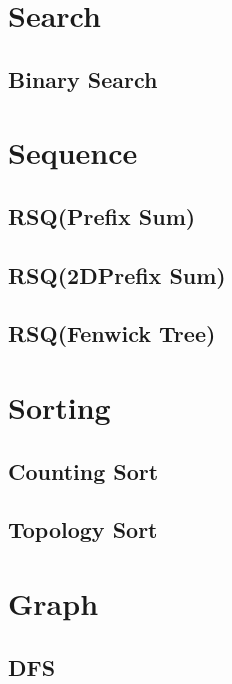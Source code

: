 \section{Search}

\subsection{Binary Search}

\section{Sequence}

\subsection{RSQ(Prefix Sum)}


\subsection{RSQ(2DPrefix Sum)}


\subsection{RSQ(Fenwick Tree)}

\section{Sorting}

\subsection{Counting Sort}


\subsection{Topology Sort}


\section{Graph}

\subsection{DFS}


